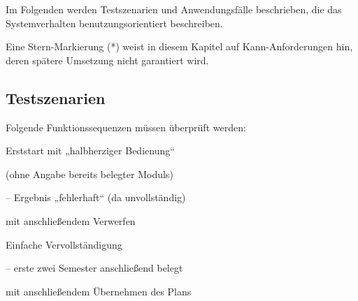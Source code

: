 \newenvironment{tblitemize}{
	\begin{itemize}[nosep,leftmargin=12pt]
}{
	\end{itemize}\hspace{0pt}\vspace{-\baselineskip}
}

\newcommand{\lA}[1]{\label{A#1}A#1}

\newcommand{\refA}[1]{\hyperref[A#1]{/A#1/}}

\newcommand{\opt}{*} 

\newcommand{\case}[1]{\textit{#1}}


Im Folgenden werden Testszenarien und Anwendungsfälle beschrieben, die das Systemverhalten benutzungsorientiert beschreiben.

Eine Stern-Markierung (\opt) weist in diesem Kapitel auf Kann-Anforderungen hin, deren spätere Umsetzung nicht garantiert wird.

\subsection{Testszenarien}
Folgende Funktionssequenzen müssen überprüft werden:

\begin{scenario}{Erststart mit „halbherziger Bedienung“}
	\item {} (ohne Angabe bereits belegter \glspl{Modul})
	\item {}
	\item {} – Ergebnis „fehlerhaft“ (da unvollständig)
	\item {} mit anschließendem Verwerfen
	\item {}
	\item {} 
	\item {}
\end{scenario}

\begin{scenario}{Einfache Vervollständigung}
	\item {}
	\item {} – erste zwei Semester anschließend belegt
	\item {}
	\item {} mit anschließendem Übernehmen des Plans
	\item {} 
	\item {}
	\item {}
	\item {}
\end{scenario}

